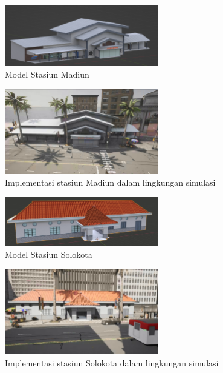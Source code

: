 \begin{figure}[!h]
    \centering
    \includegraphics[width=0.6\textwidth]{resources/chapter-3-stasiun-madiun-model.png}
    \caption{Model Stasiun Madiun}
    \label{fig:stasiun-madiun-model}
\end{figure}

\begin{figure}[!h]
    \centering
    \includegraphics[width=0.6\textwidth]{resources/chapter-4/stasiun-madiun-carla.png}
    \caption{Implementasi stasiun Madiun dalam lingkungan simulasi}
    \label{fig:stasiun-madiun}
\end{figure}

\begin{figure}[!h]
    \centering
    \includegraphics[width=0.6\textwidth]{resources/chapter-3-stasiun-solokota-model.png}
    \caption{Model Stasiun Solokota}
    \label{fig:stasiun-solokota-model}
\end{figure}

\begin{figure}[!h]
    \centering
    \includegraphics[width=0.6\textwidth]{resources/chapter-4/stasiun-solokota-carla.png}
    \caption{Implementasi stasiun Solokota dalam lingkungan simulasi}
    \label{fig:stasiun-solokota}
\end{figure}

